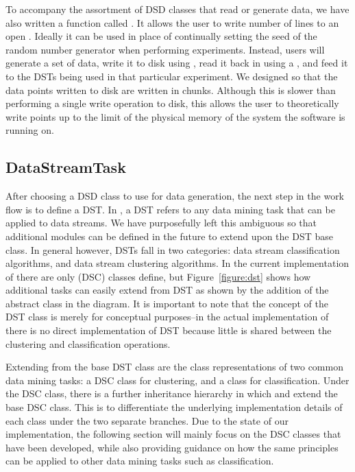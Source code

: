 \documentclass[nojss]{jss}
\begin{document}
To accompany the assortment of DSD classes that read or generate data, we have also written a function called . It allows the user to write  number of lines to an open  . Ideally it can be used in place of continually setting the seed of the random number generator when performing experiments. Instead, users will generate a set of data, write it to disk using , read it back in using a , and feed it to the DSTs being used in that particular experiment. We designed  so that the data points written to disk are written in chunks. Although this is slower than performing a single write operation to disk, this allows the user to theoretically write  points up to the limit of the physical memory of the system the software is running on.

\subsection{DataStreamTask}
\label{sec:design:dst}

After choosing a DSD class to use for data generation, the next step in the work flow is to define a DST. In , a DST refers to any data mining task that can be applied to data streams. We have purposefully left this ambiguous so that additional modules can be defined in the future to extend upon the DST base class. In general however, DSTs fall in two categories: data stream classification algorithms, and data stream clustering algorithms. In the current implementation of  there are only  (DSC) classes define, but Figure~\ref{figure:dst} shows how additional tasks can easily extend from DST as shown by the addition of the abstract class  in the diagram. It is important to note that the concept of the DST class is merely for conceptual purposes--in the actual implementation of  there is no direct implementation of DST because little is shared between the clustering and classification operations.


Extending from the base DST class are the class representations of two common data mining tasks: a DSC class for clustering, and a  class for classification. Under the DSC class, there is a further inheritance hierarchy in which  and  extend the base DSC class. This is to differentiate the underlying implementation details of each class under the two separate branches. Due to the state of our implementation, the following section will mainly focus on the DSC classes that have been developed, while also providing guidance on how the same principles can be applied to other data mining tasks such as classification.
\end{document}

